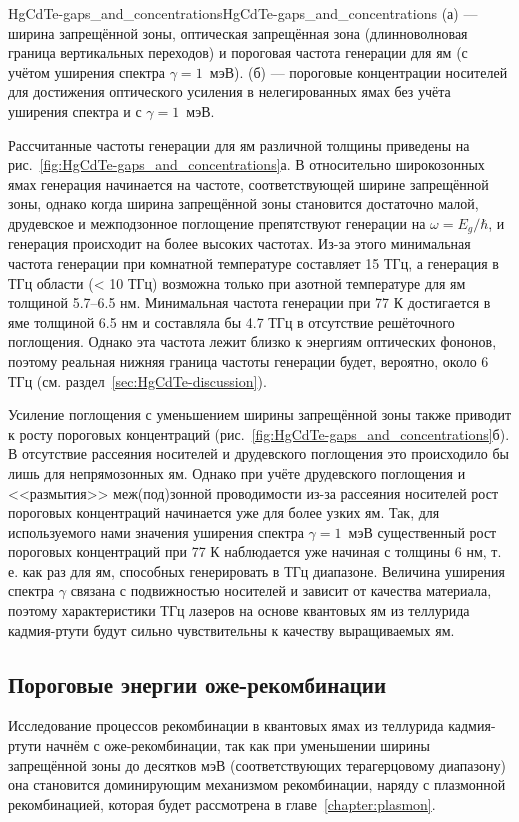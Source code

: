 \begin{fig}{HgCdTe-gaps_and_concentrations}{HgCdTe-gaps_and_concentrations} (а) --- ширина запрещённой зоны, оптическая запрещённая зона (длинноволновая граница вертикальных переходов) и пороговая частота генерации для ям \HgCdTe{} (с учётом уширения спектра $\gamma = 1$~мэВ). (б) --- пороговые концентрации носителей для достижения оптического усиления в нелегированных ямах без учёта уширения спектра и с $\gamma = 1$~мэВ.
\end{fig}

Рассчитанные частоты генерации для ям различной толщины приведены на рис.~\ref{fig:HgCdTe-gaps_and_concentrations}а. В относительно широкозонных ямах генерация начинается на частоте, соответствующей ширине запрещённой зоны, однако когда ширина запрещённой зоны становится достаточно малой, друдевское и межподзонное поглощение препятствуют генерации на $\omega = E_g/\hbar$, и генерация происходит на более высоких частотах. Из-за этого минимальная частота генерации при комнатной температуре составляет 15 ТГц, а генерация в ТГц области (< 10 ТГц) возможна только при азотной температуре для ям толщиной 5.7--6.5 нм. Минимальная частота генерации при 77 К достигается в яме толщиной 6.5 нм и составляла бы 4.7 ТГц в отсутствие решёточного поглощения. Однако эта частота лежит близко к энергиям оптических фононов, поэтому реальная нижняя граница частоты генерации будет, вероятно, около 6 ТГц (см. раздел~\ref{sec:HgCdTe-discussion}).

Усиление поглощения с уменьшением ширины запрещённой зоны также приводит к росту пороговых концентраций (рис.~\ref{fig:HgCdTe-gaps_and_concentrations}б). В отсутствие рассеяния носителей и друдевского поглощения это происходило бы лишь для непрямозонных ям. Однако при учёте друдевского поглощения и <<размытия>> меж(под)зонной проводимости из-за рассеяния носителей рост пороговых концентраций начинается уже для более узких ям. Так, для используемого нами значения уширения спектра $\gamma = 1$~мэВ существенный рост пороговых концентраций при 77 К наблюдается уже начиная с толщины 6 нм, т. е. как раз для ям, способных генерировать в ТГц диапазоне. Величина уширения спектра $\gamma$ связана с подвижностью носителей и зависит от качества материала, поэтому характеристики ТГц лазеров на основе квантовых ям из теллурида кадмия-ртути будут сильно чувствительны к качеству выращиваемых ям.

\subsection{Пороговые энергии оже-рекомбинации} \label{sec:HgCdTe-threshold_energies}
Исследование процессов рекомбинации в квантовых ямах из теллурида кадмия-ртути начнём с оже-рекомбинации, так как при уменьшении ширины запрещённой зоны до десятков мэВ (соответствующих терагерцовому диапазону) она становится доминирующим механизмом рекомбинации, наряду с плазмонной рекомбинацией, которая будет рассмотрена в главе~\ref{chapter:plasmon}.

